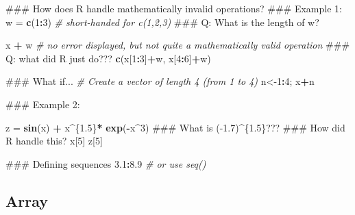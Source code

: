 \documentclass[12pt,]{book}
\newenvironment{Shaded}{\begin{snugshade}}{\end{snugshade}}
\newcommand{\KeywordTok}[1]{\textcolor[rgb]{0.13,0.29,0.53}{\textbf{#1}}}
\newcommand{\DecValTok}[1]{\textcolor[rgb]{0.00,0.00,0.81}{#1}}
\newcommand{\FloatTok}[1]{\textcolor[rgb]{0.00,0.00,0.81}{#1}}
\newcommand{\StringTok}[1]{\textcolor[rgb]{0.31,0.60,0.02}{#1}}
\newcommand{\CommentTok}[1]{\textcolor[rgb]{0.56,0.35,0.01}{\textit{#1}}}
\newcommand{\OperatorTok}[1]{\textcolor[rgb]{0.81,0.36,0.00}{\textbf{#1}}}
\newcommand{\NormalTok}[1]{#1}
\begin{document}
\begin{Shaded}
\begin{Highlighting}[]
\NormalTok{### How does R handle mathematically invalid operations?}
\NormalTok{### Example 1:}
\NormalTok{w =}\StringTok{ }\KeywordTok{c}\NormalTok{(}\DecValTok{1}\OperatorTok{:}\DecValTok{3}\NormalTok{)  }\CommentTok{# short-handed for c(1,2,3)}
\NormalTok{### Q: What is the length of w?}

\NormalTok{x }\OperatorTok{+}\StringTok{ }\NormalTok{w  }\CommentTok{# no error displayed, but not quite a mathematically valid operation}
\NormalTok{### Q: what did R just do???}
\KeywordTok{c}\NormalTok{(x[}\DecValTok{1}\OperatorTok{:}\DecValTok{3}\NormalTok{]}\OperatorTok{+}\NormalTok{w, x[}\DecValTok{4}\OperatorTok{:}\DecValTok{6}\NormalTok{]}\OperatorTok{+}\NormalTok{w)}

\NormalTok{### What if...}
\CommentTok{# Create a vector of length 4 (from 1 to 4)}
\NormalTok{n<-}\DecValTok{1}\OperatorTok{:}\DecValTok{4}\NormalTok{;}
\NormalTok{x}\OperatorTok{+}\NormalTok{n}

\NormalTok{### Example 2:}

\NormalTok{z =}\StringTok{ }\KeywordTok{sin}\NormalTok{(x) }\OperatorTok{+}\StringTok{ }\NormalTok{x}\OperatorTok{^}\NormalTok{\{}\FloatTok{1.5}\NormalTok{\}}\OperatorTok{*}\StringTok{ }\KeywordTok{exp}\NormalTok{(}\OperatorTok{-}\NormalTok{x}\OperatorTok{^}\DecValTok{3}\NormalTok{)}
\NormalTok{### What is (-1.7)^\{1.5\}???}
\NormalTok{### How did R handle this?}
\NormalTok{x[}\DecValTok{5}\NormalTok{]}
\NormalTok{z[}\DecValTok{5}\NormalTok{]}

\NormalTok{### Defining sequences}
\FloatTok{3.1}\OperatorTok{:}\FloatTok{8.9}
\CommentTok{# or use seq()}
\end{Highlighting}
\end{Shaded}

\subsection{Array}\label{array}
\end{document}
